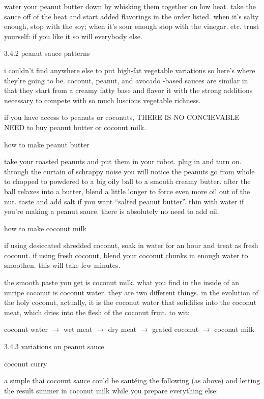 water your peanut butter down by whisking them together on low heat. take the sauce off of the heat and start added flavorings in the order listed. when it's salty enough, stop with the soy; when it's sour enough stop with the vinegar. etc. trust yourself: if you like it so will everybody else.

3.4.2  peanut sauce patterns

i couldn't find anywhere else to put high-fat vegetable variations so here's where they're going to be. coconut, peanut, and avocado -based sauces are similar in that they start from a creamy fatty base and flavor it with the strong additions necessary to compete with so much luscious vegetable richness.

if you have access to peanuts or coconuts, THERE IS NO CONCIEVABLE NEED to buy peanut butter or coconut milk.

how to make peanut butter

take your roasted peanuts and put them in your robot. plug in and turn on.
through the curtain of schrappy noise you will notice the peanuts go from whole to chopped to powdered to a big oily ball to a smooth creamy butter. after the ball relaxes into a butter, blend a little longer to force even more oil out of the nut. taste and add salt if you want ``salted peanut butter''. thin with water if you're making a peanut sauce. there is absolutely no need to add oil.

how to make coconut milk

if using desiccated shredded coconut, soak in water for an hour and treat as fresh coconut.
if using fresh coconut, blend your coconut chunks in enough water to smoothen. this will take few minutes.

the smooth paste you get is coconut milk. what you find in the inside of an unripe coconut is coconut water. they are two different things. in the evolution of the holy coconut, actually, it is the coconut water that solidifies into the coconut meat, which dries into the flesh of the coconut fruit. to wit:

coconut water $\rightarrow$ wet meat $\rightarrow$ dry meat $\rightarrow$ grated coconut $\rightarrow$ coconut milk

3.4.3  variations on peanut sauce

coconut curry

a simple thai coconut sauce could be saut\'{e}ing the following (as above) and letting the result simmer in coconut milk while you prepare everything else:

